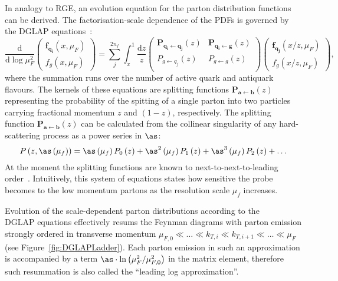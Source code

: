 In analogy to RGE, an evolution equation for the parton distribution functions can be derived. The factorisation-scale dependence of the PDFs is governed by the DGLAP equations~\cite{Altarelli:1977zs,Gribov:1972,Dokshitzer:1977,Balitsky:1978}:
\begin{equation}
\frac{\mathrm{d}}{\mathrm{d}\log{\mu_F^2}}
 \begin{pmatrix}
	\mathbf{f_{q_i}}\left(x,\mu_F\right) \\
	f_g\left(x,\mu_F\right)
 \end{pmatrix} = 
\sum_j^{2n_f}{\int_x^1{\frac{\mathrm{d}z}{z}
 \begin{pmatrix}
  \mathbf{P_{q_i \leftarrow q_j}}\left(z\right) & \mathbf{P_{q_i \leftarrow  g}}\left(z\right) \\
  P_{g \leftarrow q_j}\left(z\right) & P_{g \leftarrow g}\left(z\right) \\
 \end{pmatrix}
 \begin{pmatrix}
	\mathbf{f_{q_j}}\left(x/z,\mu_F\right) \\
	f_g\left(x/z,\mu_F\right)
 \end{pmatrix}
}},
\label{eq:dglap}
\end{equation}
where the summation runs over the number of active quark and antiquark flavours. The kernels of these equations are splitting functions $\mathbf{P_{a \leftarrow  b}}\left(z\right)$ representing the probability of the spitting of a single parton into two particles carrying fractional momentum $z$ and $\left(1-z\right)$, respectively. The splitting function $\mathbf{P_{a \leftarrow  b}}\left(z\right)$ can be calculated from the collinear singularity of any hard-scattering process as a power series in $\as$:
\begin{equation}
P\left(z,\as\left(\mu_f\right)\right) = \as\left(\mu_f\right) P_0\left(z\right) + \as^2\left(\mu_f\right)P_1\left(z\right) + \as^3\left(\mu_f\right)P_2\left(z\right) + \dots
\label{eq:splittingfunc}
\end{equation}
At the moment the splitting functions are known to next-to-next-to-leading order~\cite{Vogt:2004mw,Moch:2004pa}. Intuitively, this system of equations states how sensitive the probe becomes to the low momentum partons as the resolution scale $\mu_f$ increases. %

Evolution of the scale-dependent parton distributions according to the \\DGLAP equations effectively resums the Feynman diagrams with parton emission strongly ordered in transverse momentum $ \mu_{F,0} \ll \ldots \ll k_{T,i} \ll k_{T,i+1} \ll \ldots \ll \mu_F$ (see Figure~\ref{fig:DGLAPLadder}). Each parton emission in such an approximation is accompanied by a term $\as\cdot\ln{\left(\mu^2_F/\mu^2_{F,0}\right)}$ in the matrix element, therefore such resummation is also called the ``leading log approximation''.

